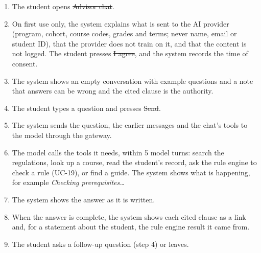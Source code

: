 \begin{enumerate}
  \item The student opens \st{Advisor chat}.
  \item On first use only, the system explains what is sent to the AI provider (program, cohort, course codes, grades and
        terms; never name, email or student ID), that the provider does not train on it, and that the content is not
        logged. The student presses \st{I agree}, and the system records the time of consent.
  \item The system shows an empty conversation with example questions and a note that answers can be wrong and the cited
        clause is the authority.
  \item The student types a question and presses \st{Send}.
  \item The system sends the question, the earlier messages and the chat's tools to the model through the gateway.
  \item The model calls the tools it needs, within 5 model turns: search the regulations, look up a course, read the
        student's record, ask the rule engine to check a rule (UC-19), or find a guide. The system shows what is happening,
        for example \emph{Checking prerequisites\ldots}
  \item The system shows the answer as it is written.
  \item When the answer is complete, the system shows each cited clause as a link and, for a statement about the student,
        the rule engine result it came from.
  \item The student asks a follow-up question (step 4) or leaves.
\end{enumerate}


